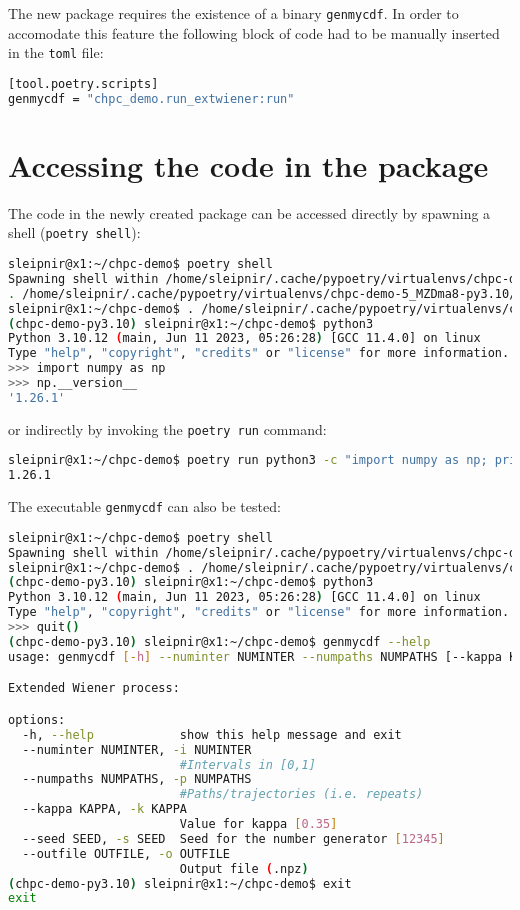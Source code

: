 \documentclass[10pt]{article}
\begin{document}
The new package requires the existence of a binary \texttt{genmycdf}. In order to accomodate this feature the following block of 
code had to be manually inserted in the \texttt{toml} file:
\begin{lstlisting}[language=bash]
[tool.poetry.scripts]
genmycdf = "chpc_demo.run_extwiener:run"
\end{lstlisting}


\section{Accessing the code in the package}
The code in the newly created package can be accessed directly by spawning a shell (\texttt{poetry shell}):
\begin{lstlisting}[language=bash]
sleipnir@x1:~/chpc-demo$ poetry shell 
Spawning shell within /home/sleipnir/.cache/pypoetry/virtualenvs/chpc-demo-5_MZDma8-py3.10
. /home/sleipnir/.cache/pypoetry/virtualenvs/chpc-demo-5_MZDma8-py3.10/bin/activate
sleipnir@x1:~/chpc-demo$ . /home/sleipnir/.cache/pypoetry/virtualenvs/chpc-demo-5_MZDma8-py3.10/bin/activate
(chpc-demo-py3.10) sleipnir@x1:~/chpc-demo$ python3
Python 3.10.12 (main, Jun 11 2023, 05:26:28) [GCC 11.4.0] on linux
Type "help", "copyright", "credits" or "license" for more information.
>>> import numpy as np
>>> np.__version__
'1.26.1'
\end{lstlisting}
or indirectly by invoking 
the \texttt{poetry run} command:
\begin{lstlisting}[language=bash]
sleipnir@x1:~/chpc-demo$ poetry run python3 -c "import numpy as np; print(np.__version__)"
1.26.1
\end{lstlisting}

The executable \texttt{genmycdf} can also be tested:
\begin{lstlisting}[language=bash]
sleipnir@x1:~/chpc-demo$ poetry shell
Spawning shell within /home/sleipnir/.cache/pypoetry/virtualenvs/chpc-demo-5_MZDma8-py3.10
sleipnir@x1:~/chpc-demo$ . /home/sleipnir/.cache/pypoetry/virtualenvs/chpc-demo-5_MZDma8-py3.10/bin/activate
(chpc-demo-py3.10) sleipnir@x1:~/chpc-demo$ python3
Python 3.10.12 (main, Jun 11 2023, 05:26:28) [GCC 11.4.0] on linux
Type "help", "copyright", "credits" or "license" for more information.
>>> quit()
(chpc-demo-py3.10) sleipnir@x1:~/chpc-demo$ genmycdf --help
usage: genmycdf [-h] --numinter NUMINTER --numpaths NUMPATHS [--kappa KAPPA] [--seed SEED] --outfile OUTFILE

Extended Wiener process:

options:
  -h, --help            show this help message and exit
  --numinter NUMINTER, -i NUMINTER
                        #Intervals in [0,1]
  --numpaths NUMPATHS, -p NUMPATHS
                        #Paths/trajectories (i.e. repeats)
  --kappa KAPPA, -k KAPPA
                        Value for kappa [0.35]
  --seed SEED, -s SEED  Seed for the number generator [12345]
  --outfile OUTFILE, -o OUTFILE
                        Output file (.npz)
(chpc-demo-py3.10) sleipnir@x1:~/chpc-demo$ exit
exit
\end{lstlisting}
\end{document}
